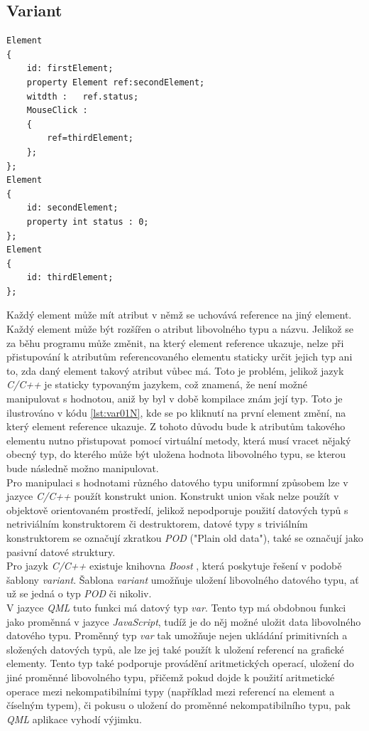\documentclass[11pt,twoside,a4paper]{book}
\begin{document}
\subsection {Variant}
\begin{lstlisting}[frame=single,caption=Ukázka \textit{CQML} kódu ilustrující nemožnost staticky určit existenci specifického atributu.,label=lst:var01N]
Element
{
	id: firstElement;
	property Element ref:secondElement;
	witdth :   ref.status;
	MouseClick :
	{
		ref=thirdElement;
	};
};
Element
{
	id: secondElement;
	property int status : 0;
};
Element
{
	id: thirdElement;
};
\end{lstlisting}
Každý element může mít atribut v němž se uchovává reference na jiný element. Každý element může být rozšířen o atribut libovolného typu a názvu. Jelikož se za běhu programu může změnit, na který element reference ukazuje, nelze při přistupování k atributům referencovaného elementu staticky určit jejich typ ani to, zda daný element takový atribut vůbec má. Toto je problém, jelikož jazyk \textit{C/C++} je staticky typovaným jazykem, což znamená, že není možné manipulovat s hodnotou, aniž by byl v době kompilace znám její typ. Toto je ilustrováno v kódu \ref{lst:var01N}, kde se po kliknutí na první element změní, na který element reference ukazuje. Z tohoto důvodu bude k atributům takového elementu nutno přistupovat pomocí virtuální metody, která musí vracet nějaký obecný typ, do kterého může být uložena hodnota libovolného typu, se kterou bude následně možno manipulovat.\\
Pro manipulaci s hodnotami různého datového typu uniformní způsobem lze v jazyce \textit{C/C++} použít konstrukt union. Konstrukt union však nelze použít v objektově orientovaném prostředí, jelikož nepodporuje použití datových typů s netriviálním konstruktorem či destruktorem, datové typy s triviálním konstruktorem se označují zkratkou \textit{POD} ("Plain old data"), také se označují jako pasivní datové struktury.\\
Pro jazyk \textit{C/C++} existuje knihovna \textit{Boost} \cite{bib:boost}, která poskytuje řešení v podobě šablony \textit{variant}. Šablona \textit{variant} umožňuje uložení libovolného datového typu, ať už se jedná o typ \textit{POD} či nikoliv.\\
V jazyce \textit{QML} tuto funkci má datový typ \textit{var}. Tento typ má obdobnou funkci jako proměnná v jazyce \textit{JavaScript}, tudíž je do něj možné uložit data libovolného datového typu. Proměnný typ \textit{var} tak umožňuje nejen ukládání primitivních a složených datových typů, ale lze jej také použít k uložení referencí na grafické elementy. Tento typ také podporuje provádění aritmetických operací, uložení do jiné proměnné libovolného typu, přičemž pokud dojde k použití aritmetické operace mezi nekompatibilními typy (například mezi referencí na element a číselným typem), či pokusu o uložení do proměnné nekompatibilního typu, pak \textit{QML} aplikace vyhodí výjimku.\\
\end{document}

